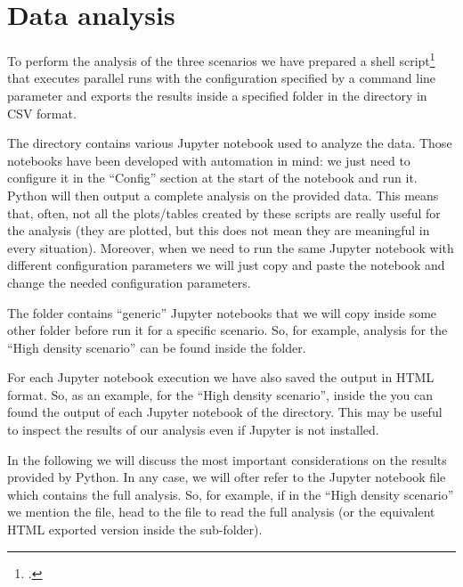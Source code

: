 \chapter{Data analysis}\label{ch:analysis}

To perform the analysis of the three scenarios we have prepared a shell
script\footnote{.} that executes parallel runs
with the configuration specified by a command line parameter and exports the
results inside a specified folder in the  directory in CSV
format.

The  directory contains various Jupyter notebook used to analyze
the data. Those notebooks have been developed with automation in mind: we just
need to configure it in the ``Config'' section at the start of the notebook and
run it. Python will then output a complete analysis on the provided data. This
means that, often, not all the plots/tables created by these scripts are really
useful for the analysis (they are plotted, but this does not mean they are
meaningful in every situation). Moreover, when we need to run the same Jupyter
notebook with different configuration parameters  we will just copy and paste the notebook and change the needed
configuration parameters.

The  folder contains ``generic'' Jupyter notebooks that we will
copy inside some other folder before run it for a specific scenario. So, for
example, analysis for the ``High density scenario'' can be found inside the
 folder.

For each Jupyter notebook execution we have also saved the output in HTML
format. So, as an example, for the ``High density scenario'', inside the
 you can found the output of each
Jupyter notebook of the  directory. This may be
useful to inspect the results of our analysis even if Jupyter is not installed.

In the following we will discuss the most important considerations on the
results provided by Python. In any case, we will ofter refer to the Jupyter
notebook file which contains the full analysis. So, for example, if in the
``High density scenario'' we mention the  file, head to the
 file to read the full analysis (or the
equivalent HTML exported version inside the  sub-folder).




